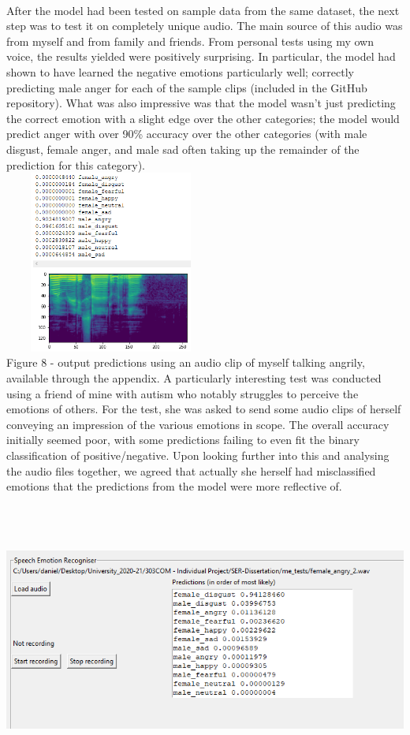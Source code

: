 \documentclass[12pt]{article}
\begin{document}
\\
\noindent After the model had been tested on sample data from the same dataset, the next step was to test it on completely unique audio. The main source of this audio was from myself and from family and friends. From personal tests using my own voice, the results yielded were positively surprising. In particular, the model had shown to have learned the negative emotions particularly well; correctly predicting male anger for each of the sample clips (included in the GitHub repository). What was also impressive was that the model wasn't just predicting the correct emotion with a slight edge over the other categories; the model would predict anger with over 90\% accuracy over the other categories (with male disgust, female anger, and male sad often taking up the remainder of the prediction for this category).
\\
\includegraphics[width=7cm, height=6cm]{figure_8_personal_prediction}
\\
Figure 8 - output predictions using an audio clip of myself talking angrily, available through the appendix.
\newpage
\noindent A particularly interesting test was conducted using a friend of mine with autism who notably struggles to perceive the emotions of others. For the test, she was asked to send some audio clips of herself conveying an impression of the various emotions in scope. The overall accuracy initially seemed poor, with some predictions failing to even fit the binary classification of positive/negative. Upon looking further into this and analysing the audio files together, we agreed that actually she herself had misclassified emotions that the predictions from the model were more reflective of. 
\begin{center}
\includegraphics[width=16cm, height=9cm]{figure_9_autism}
\end{center}
\end{document}
